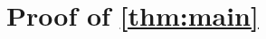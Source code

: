 \documentclass{article}
\theoremstyle{definition}
\theoremstyle{remark}
\renewcommand{\[}{\begin{eqnarray}}
\renewcommand{\]}{\end{eqnarray}}
\renewcommand{\[}{\begin{eqnarray}}
\renewcommand{\]}{\end{eqnarray}}
\begin{document}

\section{Proof of \cref{thm:main}}
\main*
\end{document}
